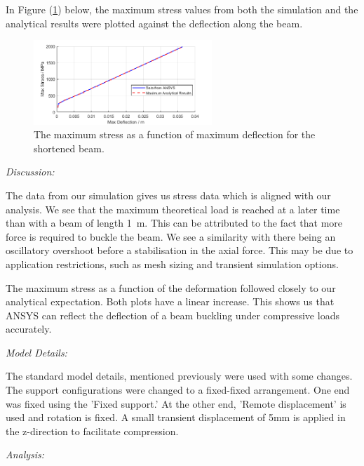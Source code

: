 \documentclass[11pt]{article}
\begin{document}
In Figure (\ref{q3stress}) below, the maximum stress values from both the simulation and the analytical results were plotted against the deflection along the beam.
\begin{figure}[H]
    \centering
    \includegraphics[width=0.6\textwidth]{q3def.png}
    \caption{The maximum stress as a function of maximum deflection for the shortened beam.}
    \label{q3stress}
\end{figure}
\textit{Discussion:}

The data from our simulation gives us stress data which is aligned with our analysis. We see that the maximum theoretical load is reached at a later time than with a beam of length \SI{1}{\meter}. This can be attributed to the fact that more force is required to buckle the beam. We see a similarity with there being an oscillatory overshoot before a stabilisation in the axial force. This may be due to application restrictions, such as mesh sizing and transient simulation options. 

The maximum stress as a function of the deformation followed closely to our analytical expectation. Both plots have a linear increase. This shows us that ANSYS can reflect the deflection of a beam buckling under compressive loads accurately. 

\textit{Model Details:}

The standard model details, mentioned previously were used with some changes. The support configurations were changed to a fixed-fixed arrangement. One end was fixed using the 'Fixed support.' At the other end, 'Remote displacement' is used and rotation is fixed. A small transient displacement of 5mm is applied in the z-direction to facilitate compression. 

\textit{Analysis:}
\end{document}
